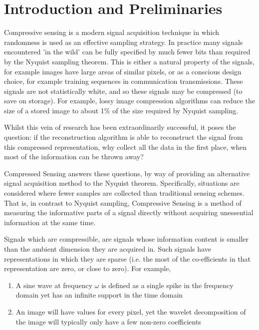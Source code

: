 \section{Introduction and Preliminaries}  \label{sec:intro}

Compressive sensing is a modern signal acquisition technique in which randomness is used as an effective sampling strategy. In practice many signals encountered 'in the wild' can be fully specified by much fewer bits than required by the Nyquist sampling theorem. This is either a natural property of the signals, for example images have large areas of similar pixels, or as a conscious design choice, for example training sequences in communication transmissions. These signals are not statistically white, and so these signals may be compressed (to save on storage). For example, lossy image compression algorithms can reduce the size of a stored image to about 1\% of the size required by Nyquist sampling. 

Whilst this vein of research has been extraordinarily successful, it poses the question: if the reconstruction algorithm is able to reconstruct the signal from this compressed representation, why collect all the data in the first place, when most of the information can be thrown away? 

Compressed Sensing answers these questions, by way of providing an alternative signal acquisition method to the Nyquist theorem. Specifically, situations are considered where fewer samples are collected than traditional sensing schemes. That is, in contrast to Nyquist sampling, Compressive Sensing is a method of measuring the informative parts of a signal directly without acquiring unessential information at the same time. 

Signals which are compressible, are signals whose information content is smaller than the ambient dimension they are acquired in. Such signals have representations in which they are sparse (i.e. the most of the co-efficients in that representation are zero, or close to zero). For example, 

\begin{enumerate}
\item  A sine wave at frequency \(\omega\) is defined as a single spike in the frequency domain yet has an infinite support in the time domain
\item An image will have values for every pixel, yet the wavelet decomposition of the image will typically only have a few non-zero coefficients
\end{enumerate} 

